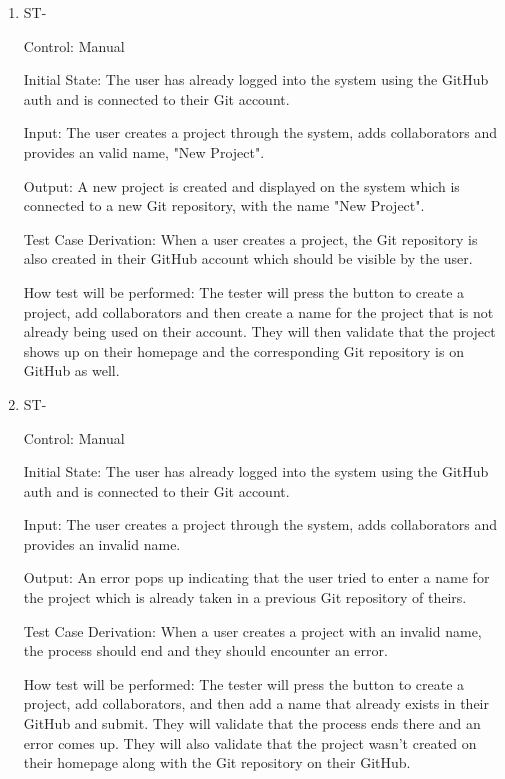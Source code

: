 \documentclass[12pt, titlepage]{article}
\newcounter{TESTID}
\newcommand\TESTNUM{\stepcounter{TESTID}\theTESTID}
\begin{document}
	\begin{enumerate}
		
		\item{ST-\TESTNUM\\}
		
		Control: Manual
		
		Initial State: The user has already logged into the system using the GitHub auth and is connected to their Git account. 
		
		Input: The user creates a project through the system, adds collaborators and provides an valid name, "New Project". 
		
		Output: A new project is created and displayed on the system which is connected to a new Git repository, with the name "New Project". 
		
		Test Case Derivation: When a user creates a project, the Git repository is also created in their GitHub account which should be visible by the user. 
		
		How test will be performed: The tester will press the button to create a project, add collaborators and then create a name for the project that is not already being used on their account. They will then validate that the project shows up on their homepage and the corresponding Git repository is on GitHub as well.
		
		\item{ST-\TESTNUM\\}
		
		Control: Manual
		
		Initial State: The user has already logged into the system using the GitHub auth and is connected to their Git account. 
		
		Input: The user creates a project through the system, adds collaborators and provides an invalid name. 
		
		Output: An error pops up indicating that the user tried to enter a name for the project which is already taken in a previous Git repository of theirs. 
		
		Test Case Derivation: When a user creates a project with an invalid name, the process should end and they should encounter an error.
		
		How test will be performed: The tester will press the button to create a project, add collaborators, and then add a name that already exists in their GitHub and submit. They will validate that the process ends there and an error comes up. They will also validate that the project wasn't created on their homepage along with the Git repository on their GitHub.
		

\end{enumerate}
\end{document}
